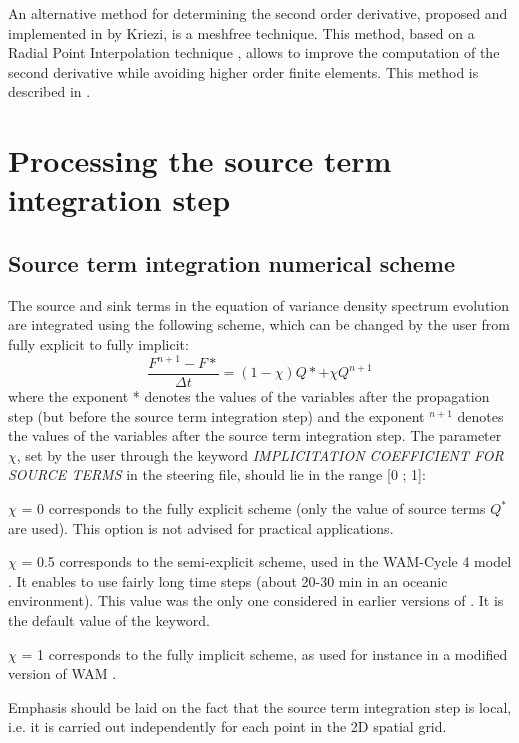  An alternative method for determining the second order derivative, proposed and implemented in \tomawac by Kriezi, is a meshfree technique. This method, based on a Radial Point Interpolation technique \cite{Liu2005}, allows to improve the computation of the second derivative while avoiding higher order finite elements. This method is described in \cite{Kriezi2006}.




\section{ Processing the source term integration step}
\label{se:sourcetermstep}


\subsection{ Source term integration numerical scheme }

 The source and sink terms in the equation of variance density spectrum evolution are integrated using the following scheme, which can be changed by the user from fully explicit to fully implicit:
\begin{equation} \label{GrindEQ__6_10_}
\frac{F^{n+1} -F*}{\Delta t} =\left(1-\chi \right)Q*+\chi Q^{n+1}
\end{equation}
where the exponent * denotes the values of the variables after the propagation step (but before the source term integration step) and the exponent ${}^{n+1}$ denotes the values of the variables after the source term integration step. The parameter $\chi$, set by the user through the keyword \textit{IMPLICITATION COEFFICIENT FOR SOURCE TERMS} in the steering file, should lie in the range [0 ; 1]:

  $\chi$ = 0 corresponds to the fully explicit scheme (only the value of source terms $Q^*$ are used). This option is not advised for practical applications.

  $\chi$ = 0.5 corresponds to the semi-explicit scheme, used in the WAM-Cycle 4 model \cite{Wamdi1988} \cite{Komen1994}. It enables to use fairly long time steps (about 20-30 min in an oceanic environment). This value was the only one considered in earlier versions of \tomawac. It is the default value of the keyword.

  $\chi$ = 1 corresponds to the fully implicit scheme, as used for instance in a modified version of WAM \cite{Hersbach1999}.

 Emphasis should be laid on the fact that the source term integration step is local, i.e. it is carried out independently for each point in the 2D spatial grid.

